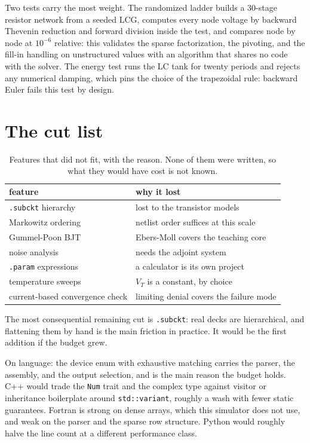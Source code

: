 \documentclass[11pt]{article}
\begin{document}
Two tests carry the most weight. The randomized ladder builds a 30-stage
resistor network from a seeded LCG, computes every node voltage by
backward Thevenin reduction and forward division inside the test, and
compares node by node at $10^{-6}$ relative: this validates the sparse
factorization, the pivoting, and the fill-in handling on unstructured
values with an algorithm that shares no code with the solver. The energy
test runs the LC tank for twenty periods and rejects any numerical
damping, which pins the choice of the trapezoidal rule: backward Euler
fails this test by design.

\section{The cut list}
\label{sec:cuts}

\begin{table}[h]
\centering
\begin{tabular}{ll}
\toprule
feature & why it lost \\
\midrule
\texttt{.subckt} hierarchy & lost to the transistor models \\
Markowitz ordering & netlist order suffices at this scale \\
Gummel-Poon BJT & Ebers-Moll covers the teaching core \\
noise analysis & needs the adjoint system \\
\texttt{.param} expressions & a calculator is its own project \\
temperature sweeps & $V_T$ is a constant, by choice \\
current-based convergence check & limiting denial covers the failure mode \\
\bottomrule
\end{tabular}
\caption{Features that did not fit, with the reason. None of them were written,
so what they would have cost is not known.}
\end{table}

The most consequential remaining cut is \texttt{.subckt}: real decks are
hierarchical, and flattening them by hand is the main friction in
practice. It would be the first addition if the budget grew.

On language: the device enum with exhaustive matching carries the parser,
the assembly, and the output selection, and is the main reason the budget
holds. C++ would trade the \texttt{Num} trait and the complex type against visitor or
inheritance boilerplate around \texttt{std::variant}, roughly a wash with fewer
static guarantees.
Fortran is strong on dense arrays, which this simulator does not use,
and weak on the parser and the sparse row structure. Python would
roughly halve the line count at a different performance class.
\end{document}
